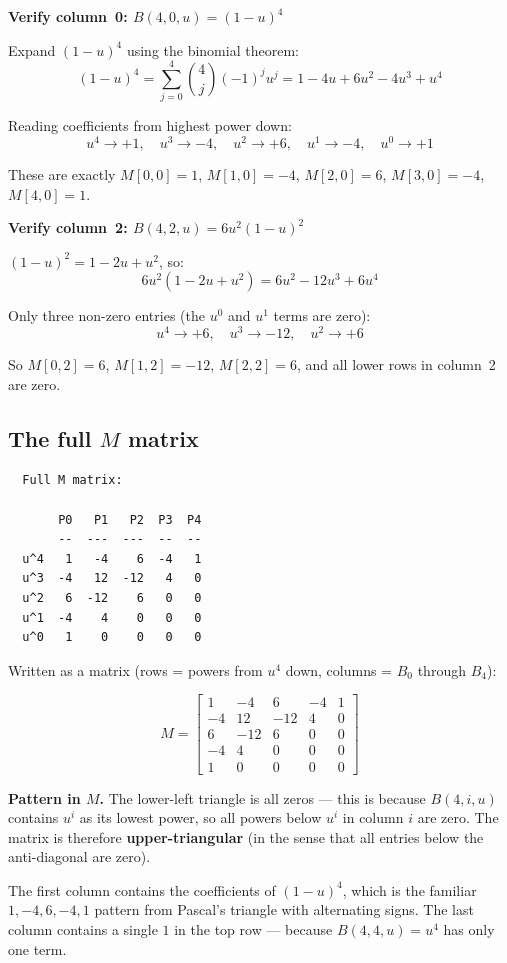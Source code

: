 \documentclass[12pt, a4paper]{article}
\begin{document}
\begin{examplebox}
\textbf{Verify column~0: $B(4,0,u) = (1-u)^4$}

Expand $(1-u)^4$ using the binomial theorem:
\[
  (1-u)^4 = \sum_{j=0}^{4} \binom{4}{j}(-1)^j u^j
  = 1 - 4u + 6u^2 - 4u^3 + u^4
\]

Reading coefficients from highest power down:
\[
  u^4 \to +1, \quad u^3 \to -4, \quad u^2 \to +6,
  \quad u^1 \to -4, \quad u^0 \to +1
\]

These are exactly $M[0,0]=1$, $M[1,0]=-4$, $M[2,0]=6$,
$M[3,0]=-4$, $M[4,0]=1$. \checkmark

\medskip
\textbf{Verify column~2: $B(4,2,u) = 6u^2(1-u)^2$}

$(1-u)^2 = 1 - 2u + u^2$, so:
\[
  6u^2(1 - 2u + u^2) = 6u^2 - 12u^3 + 6u^4
\]

Only three non-zero entries (the $u^0$ and $u^1$ terms are zero):
\[
  u^4 \to +6, \quad u^3 \to -12, \quad u^2 \to +6
\]

So $M[0,2]=6$, $M[1,2]=-12$, $M[2,2]=6$, and all lower rows
in column~2 are zero. \checkmark
\end{examplebox}

\subsection{The full $M$ matrix}

\begin{verbatim}
  Full M matrix:

       P0   P1   P2  P3  P4
       --  ---  ---  --  --
  u^4   1   -4    6  -4   1
  u^3  -4   12  -12   4   0
  u^2   6  -12    6   0   0
  u^1  -4    4    0   0   0
  u^0   1    0    0   0   0
\end{verbatim}

Written as a matrix (rows = powers from $u^4$ down, columns = $B_0$ through $B_4$):

\[
  M = \begin{bmatrix}
    1  & -4 &  6 & -4 & 1 \\
   -4  & 12 & -12 & 4 & 0 \\
    6  & -12 &  6 &  0 & 0 \\
   -4  &  4 &  0 &  0 & 0 \\
    1  &  0 &  0 &  0 & 0
  \end{bmatrix}
\]

\begin{notebox}
\textbf{Pattern in $M$.}
The lower-left triangle is all zeros --- this is because
$B(4,i,u)$ contains $u^i$ as its lowest power, so all
powers below $u^i$ in column $i$ are zero.
The matrix is therefore \textbf{upper-triangular}
(in the sense that all entries below the anti-diagonal are zero).

The first column contains the coefficients of $(1-u)^4$,
which is the familiar $1, -4, 6, -4, 1$ pattern from Pascal's triangle
with alternating signs.
The last column contains a single $1$ in the top row ---
because $B(4,4,u) = u^4$ has only one term.
\end{notebox}
\end{document}
